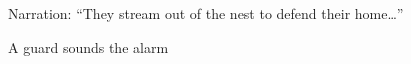 \documentclass[
  letterpaper,
  DIV=11,
  numbers=noendperiod]{scrartcl}
\begin{document}
\begin{figure}
\begin{minipage}[t]{0.50\linewidth}
{\centering 


\caption{\label{fig-weaver-ants-2}A guard sounds the alarm}

}

\end{minipage}%
\newline
\begin{minipage}[t]{0.50\linewidth}

{\centering 

Narration: ``They stream out of the nest to defend their home\ldots{}''

}

\end{minipage}%
%
\begin{minipage}[t]{0.50\linewidth}

{\centering 

}
\end{minipage}
\end{figure}
\end{document}
